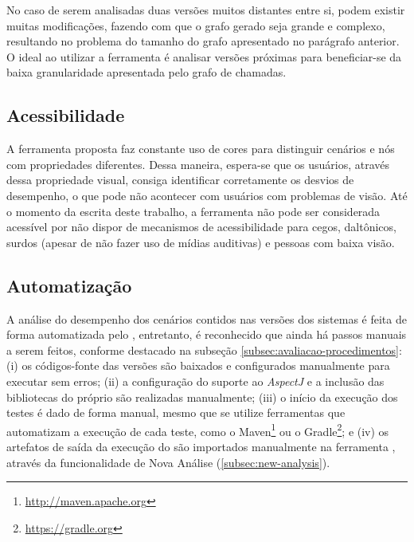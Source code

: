 No caso de serem analisadas duas versões muitos distantes entre si, podem existir muitas modificações, fazendo com que o grafo gerado seja grande e complexo, resultando no problema do tamanho do grafo apresentado no parágrafo anterior. O ideal ao utilizar a ferramenta é analisar versões próximas para beneficiar-se da baixa granularidade apresentada pelo grafo de chamadas.

\subsection{Acessibilidade} \label{subsec:consideracoes-limitacoes-acesibilidade}

A ferramenta proposta faz constante uso de cores para distinguir cenários e nós com propriedades diferentes. Dessa maneira, espera-se que os usuários, através dessa propriedade visual, consiga identificar corretamente os desvios de desempenho, o que pode não acontecer com usuários com problemas de visão. Até o momento da escrita deste trabalho, a ferramenta não pode ser considerada acessível por não dispor de mecanismos de acessibilidade para cegos, daltônicos, surdos (apesar de não fazer uso de mídias auditivas) e pessoas com baixa visão.

\subsection{Automatização} \label{subsec:consideracoes-limitacoes-automatizacao}

A análise do desempenho dos cenários contidos nas versões dos sistemas é feita de forma automatizada pelo \textit{\perfMinerName}, entretanto, é reconhecido que ainda há passos manuais a serem feitos, conforme destacado na subseção \ref{subsec:avaliacao-procedimentos}: (i) os códigos-fonte das versões são baixados e configurados manualmente para executar sem erros; (ii) a configuração do suporte ao \textit{AspectJ} e a inclusão das bibliotecas do próprio \textit{\perfMinerName} são realizadas manualmente; (iii) o início da execução dos testes é dado de forma manual, mesmo que se utilize ferramentas que automatizam a execução de cada teste, como o Maven\footnote{\href{http://maven.apache.org}{http://maven.apache.org}} ou o Gradle\footnote{\href{https://gradle.org}{https://gradle.org}}; e (iv) os artefatos de saída da execução do \textit{\perfMinerName} são importados manualmente na ferramenta \textit{\toolName}, através da funcionalidade de Nova Análise (\ref{subsec:new-analysis}).

